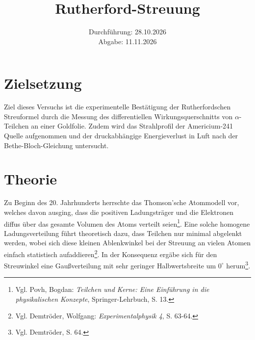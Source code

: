  



\subject{V16}
\title{Rutherford-Streuung} \date{Durchführung: 28.10.2026 \\ Abgabe: 11.11.2026 }

\maketitle
\thispagestyle{empty}

\clearpage

\tableofcontents
\clearpage


\section{Zielsetzung}
Ziel dieses Versuchs ist die experimentelle Bestätigung der Rutherfordschen Streuformel durch die Messung des differentiellen Wirkungsquerschnitts von $\alpha$-Teilchen an einer Goldfolie. Zudem wird das Strahlprofil der Americium-241 Quelle aufgenommen und der druckabhängige Energieverlust in Luft nach der Bethe-Bloch-Gleichung untersucht.

\section{Theorie}
Zu Beginn des 20. Jahrhunderts herrschte das Thomson'sche Atommodell vor, welches davon ausging, dass die positiven Ladungsträger und die Elektronen diffus über das gesamte Volumen des Atoms verteilt seien\footnote{Vgl. Povh, Bogdan: \textit{Teilchen und Kerne: Eine Einführung in die physikalischen Konzepte}, Springer-Lehrbuch, S. 13.}. Eine solche homogene Ladungsverteilung führt theoretisch dazu, dass Teilchen nur minimal abgelenkt werden, wobei sich diese kleinen Ablenkwinkel bei der Streuung an vielen Atomen einfach statistisch aufaddieren\footnote{Vgl. Demtröder, Wolfgang: \textit{Experimentalphysik 4}, S. 63-64.}. In der Konsequenz ergäbe sich für den Streuwinkel eine Gaußverteilung mit sehr geringer Halbwertsbreite um $0^\circ$ herum\footnote{Vgl. Demtröder, S. 64.}.

